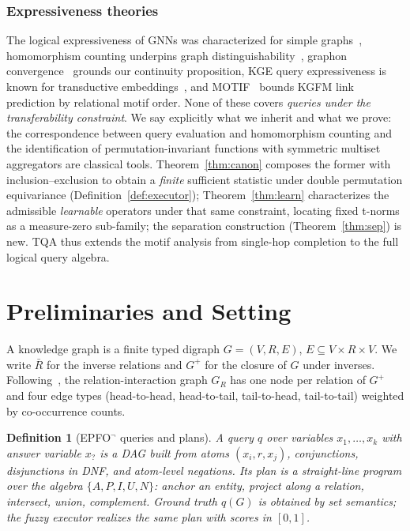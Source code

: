 \documentclass[journal]{IEEEtran}
\newtheorem{definition}{Definition}
\begin{document}
\subsubsection{Expressiveness theories} The logical expressiveness of GNNs was characterized for simple
graphs~\cite{barcelo2020logical,grohe2021gnn,xu2019gin,morris2019weisfeiler},
homomorphism counting underpins graph
distinguishability~\cite{dell2018hom}, graphon
convergence~\cite{borgs2015graphon} grounds our continuity proposition, KGE query
expressiveness is known for transductive embeddings~\cite{gao2024kge}, and
MOTIF~\cite{huang2025motif} bounds KGFM link prediction by relational motif
order. None of these covers \emph{queries under the transferability
constraint}. We say explicitly what we inherit and what we prove: the
correspondence between query evaluation and homomorphism counting
\cite{dell2018hom,grohe2021gnn} and the identification of
permutation-invariant functions with symmetric multiset aggregators
\cite{morris2019weisfeiler,xu2019gin,zhou2023double} are classical
tools. Theorem~\ref{thm:canon} composes the former with
inclusion--exclusion to obtain a \emph{finite} sufficient statistic
under double permutation equivariance (Definition~\ref{def:executor});
Theorem~\ref{thm:learn} characterizes the admissible \emph{learnable}
operators under that same constraint, locating fixed t-norms as a
measure-zero sub-family; the separation construction
(Theorem~\ref{thm:sep}) is new. TQA thus extends the motif analysis
from single-hop completion to the full logical query algebra.

\section{Preliminaries and Setting}\label{sec:prelim}

A knowledge graph is a finite typed digraph
$G=(V,R,E)$, $E\subseteq V\times R\times V$. We write $\bar R$ for the
inverse relations and $G^{+}$ for the closure of $G$ under inverses.
Following~\cite{galkin2024ultra}, the relation-interaction graph $G_R$ has
one node per relation of $G^{+}$ and four edge types (head-to-head,
head-to-tail, tail-to-head, tail-to-tail) weighted by co-occurrence counts.

\begin{definition}[EPFO$^\neg$ queries and plans]\label{def:query}
A query $q$ over variables $x_1,\dots,x_k$ with answer variable $x_?$ is a
DAG built from atoms $(x_i,r,x_j)$, conjunctions, disjunctions in DNF, and
atom-level negations. Its \emph{plan} is a straight-line program over the
algebra $\{A,P,I,U,N\}$: anchor an entity, project along a relation,
intersect, union, complement. Ground truth $q(G)$ is obtained by set
semantics; the fuzzy executor realizes the same plan with scores in
$[0,1]$.
\end{definition}
\end{document}
